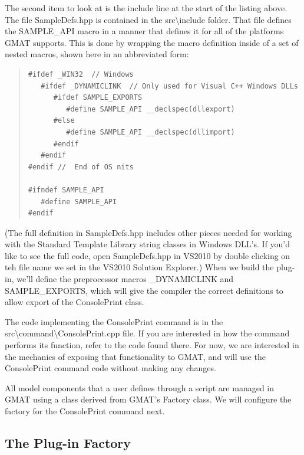 \documentclass[10pt,letterpaper]{article}
\begin{document}
The second item to look at is the include line at the start of the listing above.  The file SampleDefs.hpp is contained in the src{\textbackslash}include folder.  That file defines the SAMPLE{\_}API macro in a manner that defines it for all of the platforms GMAT supports.  This is done by wrapping the macro definition inside of a set of nested macros, shown here in an abbreviated form:

\begin{quote}
\begin{verbatim}
#ifdef _WIN32  // Windows
   #ifdef _DYNAMICLINK  // Only used for Visual C++ Windows DLLs
      #ifdef SAMPLE_EXPORTS
         #define SAMPLE_API __declspec(dllexport)
      #else
         #define SAMPLE_API __declspec(dllimport)
      #endif
   #endif
#endif //  End of OS nits

#ifndef SAMPLE_API
   #define SAMPLE_API
#endif
\end{verbatim}
\end{quote}

\noindent (The full definition in SampleDefs.hpp includes other pieces needed for working with the Standard Template Library string classes in Windows DLL's.  If you'd like to see the full code, open SampleDefs.hpp in VS2010 by double clicking on teh file name we set in the VS2010 Solution Explorer.)  When we build the plug-in, we'll define the preprocessor macros {\_}DYNAMICLINK and SAMPLE{\_}EXPORTS, which will give the compiler the correct definitions to allow export of the ConsolePrint class.

The code implementing the ConsolePrint command is in the src{\textbackslash}command{\textbackslash}ConsolePrint.cpp file.  If you are interested in how the command performs its function, refer to the code found there.  For now, we are interested in the mechanics of exposing that functionality to GMAT, and will use the ConsolePrint command code without making any changes.  

All model components that a user defines through a script are managed in GMAT using a class derived from GMAT's Factory class.  We will configure the factory for the ConsolePrint command next.  

\subsection{The Plug-in Factory}
\end{document}
